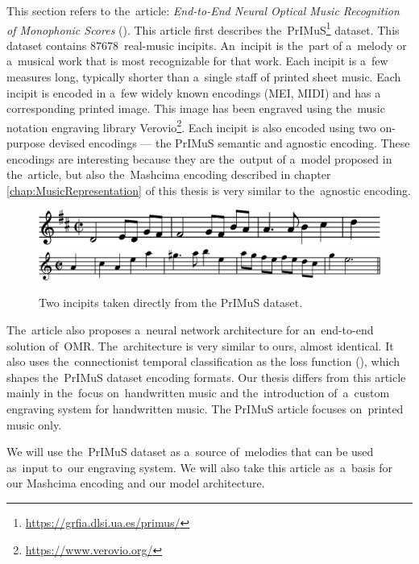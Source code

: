 This section refers to the~article: \emph{End-to-End Neural Optical Music Recognition of Monophonic Scores} (\cite{Primus}). This article first describes the~PrIMuS\footnote{\href{https://grfia.dlsi.ua.es/primus/}{https://grfia.dlsi.ua.es/primus/}} dataset. This dataset contains 87678~real-music incipits. An~incipit is the~part of a~melody or a~musical work that is most recognizable for that work. Each incipit is a~few measures long, typically shorter than a~single staff of printed sheet music. Each incipit is encoded in a~few widely known encodings (MEI, MIDI) and has a corresponding printed image. This image has been engraved using the~music notation engraving library Verovio\footnote{\href{https://www.verovio.org/}{https://www.verovio.org/}}. Each incipit is also encoded using two on-purpose devised encodings --- the PrIMuS semantic and agnostic encoding. These encodings are interesting because they are the~output of a~model proposed in the~article, but also the~Mashcima encoding described in chapter \ref{chap:MusicRepresentation} of this thesis is very similar to the~agnostic encoding.

\begin{figure}[h]
    \centering
    \includegraphics[width=120mm]{../img/primus-incipit}
    \\
    \medskip
    \includegraphics[width=140mm]{../img/primus-incipit-2}
    \caption{Two incipits taken directly from the PrIMuS dataset.}
    \label{fig2:PrimusIncipits}
\end{figure}

The~article also proposes a~neural network architecture for an~end-to-end solution of~OMR. The~architecture is very similar to ours, almost identical. It also uses the~connectionist temporal classification as the loss function (\cite{CTC}), which shapes the~PrIMuS dataset encoding formats. Our thesis differs from this article mainly in the~focus on~handwritten music and the~introduction of~a~custom engraving system for handwritten music. The PrIMuS article focuses on~printed music only.

We will use the~PrIMuS dataset as a~source of~melodies that can be used as~input to~our engraving system. We will also take this article as~a~basis for our Mashcima encoding and our model architecture.


